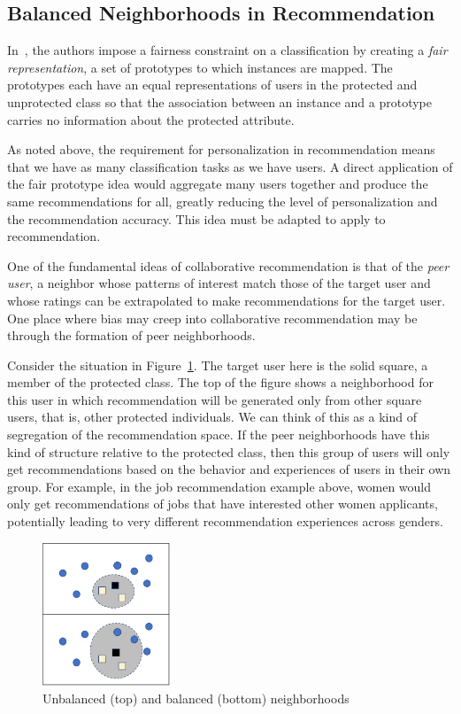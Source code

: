 \subsection{Balanced Neighborhoods in Recommendation}

In~\cite{zemel2013learning}, the authors impose a fairness constraint on a classification by creating a \textit{fair representation}, a set of prototypes to which instances are mapped. The prototypes each have an equal representations of users in the protected and unprotected class so that the association between an instance and a prototype carries no information about the protected attribute. 

As noted above, the requirement for personalization in recommendation means that we have as many classification tasks as we have users. A direct application of the fair prototype idea would aggregate many users together and produce the same recommendations for all, greatly reducing the level of personalization and the recommendation accuracy. This idea must be adapted to apply to recommendation.

One of the fundamental ideas of collaborative recommendation is that of the \textit{peer user}, a neighbor whose patterns of interest match those of the target user and whose ratings can be extrapolated to make recommendations for the target user. One place where bias may creep into collaborative recommendation may be through the formation of peer neighborhoods. 

Consider the situation in Figure~\ref{fig:neighbor}. The target user here is the solid square, a member of the protected class. The top of the figure shows a neighborhood for this user in which recommendation will be generated only from other square users, that is, other protected individuals. We can think of this as a kind of segregation of the recommendation space. If the peer neighborhoods have this kind of structure relative to the protected class, then this group of users will only get recommendations based on the behavior and experiences of users in their own group. For example, in the job recommendation example above, women would only get recommendations of jobs that have interested other women applicants, potentially leading to very different recommendation experiences across genders. 

\begin{figure}[bh]
    \centering
    \includegraphics[width=1.5in]{imgs/bln/neighborhood.pdf}
    \caption{Unbalanced (top) and balanced (bottom) neighborhoods}
    \label{fig:neighbor}
\end{figure}

